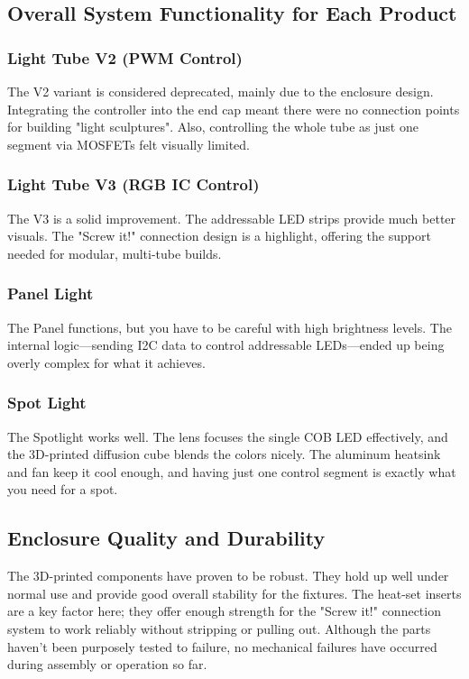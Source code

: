 \subsection{Overall System Functionality for Each Product}
\label{subsec:overall_system_functionality}
\subsubsection{Light Tube V2 (PWM Control)}
\label{subsubsec:light_tube_v2_results}
The V2 variant is considered deprecated, mainly due to the enclosure design. 
Integrating the controller into the end cap meant there were no connection points for building "light sculptures".
Also, controlling the whole tube as just one segment via MOSFETs felt visually limited.

\subsubsection{Light Tube V3 (RGB IC Control)}
\label{subsubsec:light_tube_v3_results}
The V3 is a solid improvement. 
The addressable LED strips provide much better visuals.
The "Screw it!" connection design is a highlight, offering the support needed for modular, multi-tube builds.

\subsubsection{Panel Light}
\label{subsubsec:panel_light_results}
The Panel functions, but you have to be careful with high brightness levels. 
The internal logic—sending I2C data to control addressable LEDs—ended up being overly complex for what it achieves.

\subsubsection{Spot Light}
\label{subsubsec:spot_light_results}
The Spotlight works well. The lens focuses the single COB LED effectively, and the 3D-printed diffusion cube blends the colors nicely.
The aluminum heatsink and fan keep it cool enough, and having just one control segment is exactly what you need for a spot.

\subsection{Enclosure Quality and Durability}
\label{subsec:enclosure_quality}
The 3D-printed components have proven to be robust. 
They hold up well under normal use and provide good overall stability for the fixtures. 
The heat-set inserts are a key factor here; they offer enough strength for the "Screw it!" connection system to work reliably without stripping or pulling out. 
Although the parts haven't been purposely tested to failure, no mechanical failures have occurred during assembly or operation so far.